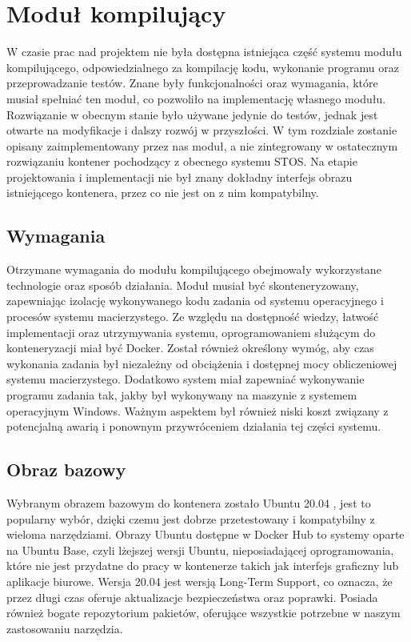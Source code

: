 \section{Moduł kompilujący}
W czasie prac nad projektem nie była dostępna istniejąca część systemu modułu kompilującego, odpowiedzialnego za kompilację kodu, wykonanie programu oraz przeprowadzanie testów. Znane były funkcjonalności oraz wymagania, które musiał spełniać ten moduł, co pozwoliło na implementację własnego modułu. Rozwiązanie w obecnym stanie było używane jedynie do testów, jednak jest otwarte na modyfikacje i dalszy rozwój w przyszłości. W tym rozdziale zostanie opisany zaimplementowany przez nas moduł, a nie zintegrowany w ostatecznym rozwiązaniu kontener pochodzący z obecnego systemu STOS. Na etapie projektowania i implementacji nie był znany dokładny interfejs obrazu istniejącego kontenera, przez co nie jest on z nim kompatybilny. 

\subsection{Wymagania}
Otrzymane wymagania do modułu kompilującego obejmowały wykorzystane technologie oraz sposób działania. Moduł musiał być skonteneryzowany, zapewniając izolację wykonywanego kodu zadania od systemu operacyjnego i procesów systemu macierzystego. Ze względu na dostępność wiedzy, łatwość implementacji oraz utrzymywania systemu, oprogramowaniem służącym do konteneryzacji miał być Docker. Został również określony wymóg, aby czas wykonania zadania był niezależny od obciążenia i dostępnej mocy obliczeniowej systemu macierzystego. Dodatkowo system miał zapewniać wykonywanie programu zadania tak, jakby był wykonywany na maszynie z systemem operacyjnym Windows. Ważnym aspektem był również niski koszt związany z potencjalną awarią i ponownym przywróceniem działania tej części systemu.

\subsection{Obraz bazowy}
Wybranym obrazem bazowym do kontenera zostało Ubuntu 20.04 \cite{linuxUbuntu}, jest to popularny wybór, dzięki czemu jest dobrze przetestowany i kompatybilny z wieloma narzędziami. Obrazy Ubuntu dostępne w Docker Hub to systemy oparte na Ubuntu Base, czyli lżejszej wersji Ubuntu, nieposiadającej oprogramowania, które nie jest przydatne do pracy w kontenerze takich jak interfejs graficzny lub aplikacje biurowe. Wersja 20.04 jest wersją Long-Term Support, co oznacza, że przez długi czas oferuje aktualizacje bezpieczeństwa oraz poprawki. Posiada również bogate repozytorium pakietów, oferujące wszystkie potrzebne w naszym zastosowaniu narzędzia.

